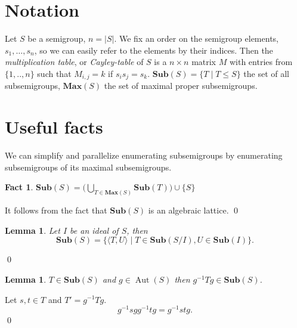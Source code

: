 \documentclass{amsart}
\newcommand{\Sub}{\mathbf{Sub}}
\newcommand{\Max}{\mathbf{Max}}
\DeclareMathOperator{\Aut}{Aut}
\theoremstyle{plain}
\newtheorem{lemma}[theorem]{Lemma}
\newtheorem{fact}[theorem]{Fact}
\theoremstyle{definition}
\begin{document}
\section{Notation}
Let $S$ be a semigroup, $n=|S|$.
We fix an order on the semigroup elements, $s_1,\ldots, s_n$, so we can easily refer to the elements by their indices. 
Then the  \emph{multiplication table}, or \emph{Cayley-table} of $S$ is a $n\times n$ matrix $M$ with entries from $\{1,..,n\}$ such that $M_{i,j}=k$ if $s_is_j=s_k$.
$\Sub(S)=\big\{T\mid T\leq S \big\}$ the set of all subsemigroups, $\Max(S)$ the set of maximal proper subsemigroups.

\section{Useful facts}
We can simplify and parallelize enumerating subsemigroups by enumerating subsemigroups of its maximal subsemigroups.
\begin{fact}
$\Sub(S)=\big( \bigcup_{T\in \Max(S)}\Sub(T)\big)\cup \{S\}$
\end{fact}
\proof
It follows from the fact that $\Sub(S)$ is an algebraic lattice.
\qed

\begin{lemma}
Let $I$ be an ideal of $S$, then $$\Sub(S)=\big\{\langle T,U \rangle\mid T\in \Sub(S/I), U\in\Sub(I)\big\}.$$
\end{lemma}
\proof

\qed

\begin{lemma}
$T\in\Sub(S)$ and $g\in \Aut(S)$ then $g^{-1}Tg\in\Sub(S)$.
\end{lemma}
\proof
Let $s,t\in T$ and $T'=g^{-1}Tg$.
$$g^{-1}sgg^{-1}tg=g^{-1}stg.$$
\qed
\end{document}
